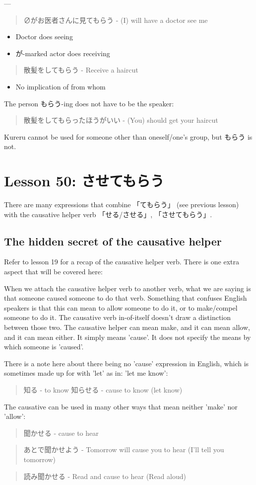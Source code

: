 \documentclass[11pt]{article}
\begin{document}
---

\begin{quote}
∅がお医者さんに見てもらう - (I) will have a doctor see me
\end{quote}
\begin{itemize}
\item Doctor does seeing
\item が-marked actor does receiving
\end{itemize}

\begin{quote}
散髪をしてもらう - Receive a haircut
\end{quote}
\begin{itemize}
\item No implication of from whom
\end{itemize}

The person もらう-ing does not have to be the speaker:
\begin{quote}
散髪をしてもらったほうがいい - (You) should get your haircut
\end{quote}
Kureru cannot be used for someone other than oneself/one's group, but もらう is not.
\section{Lesson 50: させてもらう}
\label{sec:org978c434}
There are many expressions that combine 「てもらう」 (see previous lesson) with the causative helper verb 「せる/させる」, 「させてもらう」.

\subsection{The hidden secret of the causative helper}
\label{sec:orgee415de}
Refer to lesson 19 for a recap of the causative helper verb. There is one extra aspect that will be covered here:

When we attach the causative helper verb to another verb, what we are saying is that someone caused someone to do that verb. Something that confuses English speakers is that this can mean to allow someone to do it, or to make/compel someone to do it. The causative verb in-of-itself doesn't draw a distinction between those two. The causative helper can mean make, and it can mean allow, and it can mean either. It simply means 'cause'. It does not specify the means by which someone is 'caused'.

There is a note here about there being no 'cause' expression in English, which is sometimes made up for with 'let' as in: 'let me know':
\begin{quote}
知る - to know
知らせる - cause to know (let know)
\end{quote}
The causative can be used in many other ways that mean neither 'make' nor 'allow':
\begin{quote}
聞かせる - cause to hear
\end{quote}
\begin{quote}
あとで聞かせよう - Tomorrow will cause you to hear (I'll tell you tomorrow)
\end{quote}
\begin{quote}
読み聞かせる - Read and cause to hear (Read aloud)
\end{quote}
\end{document}
